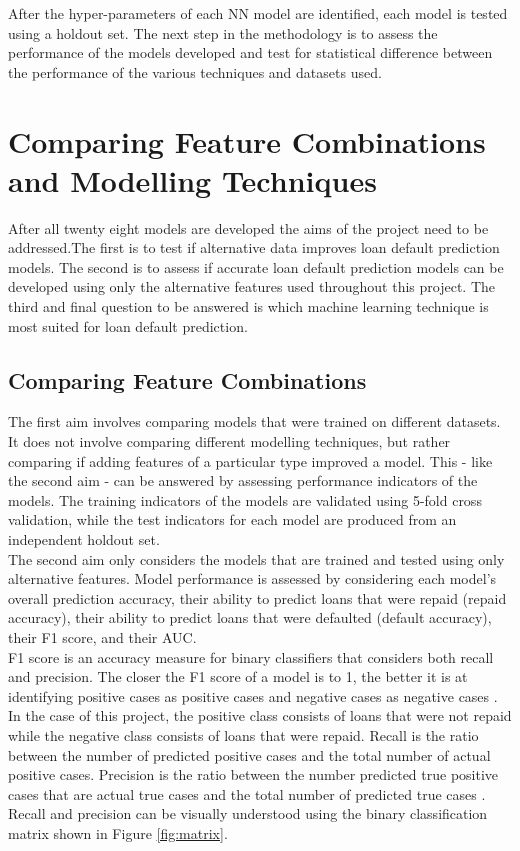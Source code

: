 After the hyper-parameters of each NN model are identified, each model is tested using a holdout set. The next step in the methodology is to assess the performance of the models developed and test for statistical difference between the performance of the various techniques and datasets used. \\



\section{Comparing Feature Combinations and Modelling Techniques}

After all twenty eight models are developed the aims of the project need to be addressed.The first is to test if alternative data improves loan default prediction models. The second is to assess if accurate loan default prediction models can be developed using only the alternative features used throughout this project. The third and final question to be answered is which machine learning technique is most suited for loan default prediction. \\

\subsection{Comparing Feature Combinations}

The first aim involves comparing models that were trained on different datasets. It does not involve comparing different modelling techniques, but rather comparing if adding features of a particular type improved a model. This - like the second aim - can be answered by assessing performance indicators of the models. The training indicators of the models are validated using 5-fold cross validation, while the test indicators for each model are produced from an independent holdout set. \\

The second aim only considers the models that are trained and tested using only alternative features. Model performance is assessed by considering each model's overall prediction accuracy, their ability to predict loans that were repaid (repaid accuracy), their ability to predict loans that were defaulted (default accuracy), their F1 score, and their AUC. \\

F1 score is an accuracy measure for binary classifiers that considers both recall and precision. The closer the F1 score of a model is to 1, the better it is at identifying positive cases as positive cases and negative cases as negative cases \parencite{f1}. In the case of this project, the positive class consists of loans that were not repaid while the negative class consists of loans that were repaid. Recall is the ratio between the number of predicted positive cases and the total number of actual positive cases. Precision is the ratio between the number predicted true positive cases that are actual true cases and the total number of predicted true cases \parencite{f1}. Recall and precision can be visually understood using the binary classification matrix shown in Figure \ref{fig:matrix}. 

